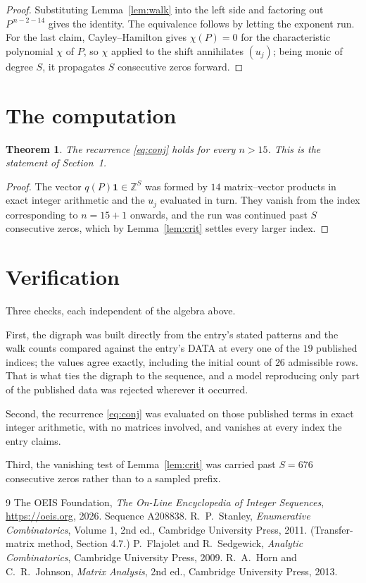 \documentclass[11pt,a4paper]{article}
\theoremstyle{plain}
\newtheorem{theorem}{Theorem}
\theoremstyle{definition}
\begin{document}
\begin{proof}
Substituting Lemma~\ref{lem:walk} into the left side and factoring out
$P^{\,n-2-14}$ gives the identity. The equivalence follows by letting the exponent
run. For the last claim, Cayley--Hamilton gives $\chi(P)=0$ for the characteristic
polynomial $\chi$ of $P$, so $\chi$ applied to the shift annihilates $(u_j)$; being monic of
degree $S$, it propagates $S$ consecutive zeros forward.
\end{proof}

\section{The computation}

\begin{theorem}
The recurrence \eqref{eq:conj} holds for every $n>15$. This is the statement of
Section~1.
\end{theorem}

\begin{proof}
The vector $q(P)\mathbf{1}\in\mathbb{Z}^{S}$ was formed by $14$ matrix--vector
products in exact integer arithmetic and the $u_j$ evaluated in turn. They vanish from the
index corresponding to $n=15+1$ onwards, and the run was continued past $S$ consecutive
zeros, which by Lemma~\ref{lem:crit} settles every larger index.
\end{proof}

\section{Verification}

Three checks, each independent of the algebra above.

First, the digraph was built directly from the entry's stated patterns and the walk counts
compared against the entry's DATA at every one of the $19$ published indices; the
values agree exactly, including the initial count of $26$ admissible rows. That is
what ties the digraph to the sequence, and a model reproducing only part of the published
data was rejected wherever it occurred.

Second, the recurrence \eqref{eq:conj} was evaluated on those published terms in exact
integer arithmetic, with no matrices involved, and vanishes at every index the entry claims.

Third, the vanishing test of Lemma~\ref{lem:crit} was carried past $S=676$ consecutive
zeros rather than to a sampled prefix.

\begin{thebibliography}{9}
 The OEIS Foundation, \emph{The On-Line Encyclopedia of Integer
Sequences}, \url{https://oeis.org}, 2026. Sequence A208838.
 R.~P.~Stanley, \emph{Enumerative Combinatorics}, Volume 1, 2nd ed.,
Cambridge University Press, 2011. (Transfer-matrix method, Section 4.7.)
 P.~Flajolet and R.~Sedgewick, \emph{Analytic Combinatorics}, Cambridge
University Press, 2009.
 R.~A.~Horn and C.~R.~Johnson, \emph{Matrix Analysis}, 2nd ed., Cambridge
University Press, 2013.
\end{thebibliography}
\end{document}
